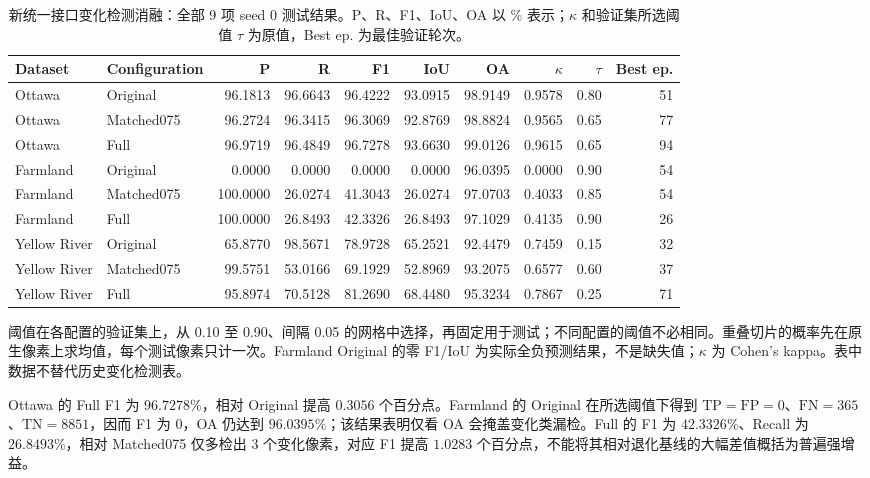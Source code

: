 \documentclass[journal]{IEEEtran}
\begin{document}
\begin{table}[!t]
\centering
\small
\setlength{\tabcolsep}{3pt}
\caption{新统一接口变化检测消融：全部 9 项 seed 0 测试结果。P、R、F1、IoU、OA 以 \% 表示；$\kappa$ 和验证集所选阈值 $\tau$ 为原值，Best ep. 为最佳验证轮次。}
\label{tab:unified_cd_seed0}
\begin{tabular*}{\textwidth}{@{\extracolsep{\fill}}llrrrrrrrr}
\toprule
Dataset & Configuration & P & R & F1 & IoU & OA & $\kappa$ & $\tau$ & Best ep. \\
\midrule
Ottawa & Original & 96.1813 & 96.6643 & 96.4222 & 93.0915 & 98.9149 & 0.9578 & 0.80 & 51 \\
Ottawa & Matched075 & 96.2724 & 96.3415 & 96.3069 & 92.8769 & 98.8824 & 0.9565 & 0.65 & 77 \\
Ottawa & Full & 96.9719 & 96.4849 & 96.7278 & 93.6630 & 99.0126 & 0.9615 & 0.65 & 94 \\
\midrule
Farmland & Original & 0.0000 & 0.0000 & 0.0000 & 0.0000 & 96.0395 & 0.0000 & 0.90 & 54 \\
Farmland & Matched075 & 100.0000 & 26.0274 & 41.3043 & 26.0274 & 97.0703 & 0.4033 & 0.85 & 54 \\
Farmland & Full & 100.0000 & 26.8493 & 42.3326 & 26.8493 & 97.1029 & 0.4135 & 0.90 & 26 \\
\midrule
Yellow River & Original & 65.8770 & 98.5671 & 78.9728 & 65.2521 & 92.4479 & 0.7459 & 0.15 & 32 \\
Yellow River & Matched075 & 99.5751 & 53.0166 & 69.1929 & 52.8969 & 93.2075 & 0.6577 & 0.60 & 37 \\
Yellow River & Full & 95.8974 & 70.5128 & 81.2690 & 68.4480 & 95.3234 & 0.7867 & 0.25 & 71 \\
\bottomrule
\end{tabular*}
\smallskip
\begin{minipage}{\linewidth}
\footnotesize
阈值在各配置的验证集上，从 0.10 至 0.90、间隔 0.05 的网格中选择，再固定用于测试；不同配置的阈值不必相同。重叠切片的概率先在原生像素上求均值，每个测试像素只计一次。Farmland Original 的零 F1/IoU 为实际全负预测结果，不是缺失值；$\kappa$ 为 Cohen's kappa。表中数据不替代历史变化检测表。
\end{minipage}
\end{table}

Ottawa 的 Full F1 为 $96.7278\%$，相对 Original 提高 $0.3056$ 个百分点。Farmland 的 Original 在所选阈值下得到 $\mathrm{TP}=\mathrm{FP}=0$、$\mathrm{FN}=365$、$\mathrm{TN}=8851$，因而 F1 为 0，OA 仍达到 $96.0395\%$；该结果表明仅看 OA 会掩盖变化类漏检。Full 的 F1 为 $42.3326\%$、Recall 为 $26.8493\%$，相对 Matched075 仅多检出 3 个变化像素，对应 F1 提高 $1.0283$ 个百分点，不能将其相对退化基线的大幅差值概括为普遍强增益。
\end{document}
